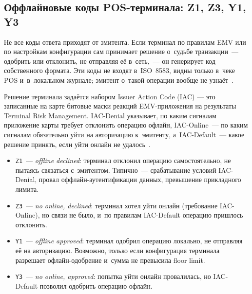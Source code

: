 \subsection*{Оффлайновые коды POS-терминала: Z1, Z3, Y1, Y3}\label{sec:decline-offline-rc}

Не все коды ответа приходят от эмитента. Если терминал по правилам
EMV или по настройкам конфигурации сам принимает решение о~судьбе
транзакции~--- одобрить или отклонить, не отправляя её в~сеть,~---
он генерирует код собственного формата. Эти коды не входят в~ISO~8583,
видны только в~чеке POS и~в~локальном журнале; эмитент о~такой
операции вообще не узнаёт~\cite{emvco-book4}.

Решение терминала задаётся набором Issuer Action Code (IAC) — это записанные на
карте битовые маски реакций EMV-приложения на результаты Terminal Risk
Management. IAC-Denial указывает, по каким сигналам приложение карты
требует отклонить операцию офлайн, IAC-Online~--- по каким сигналам
обязательно уйти на авторизацию к~эмитенту, а~IAC-Default~--- какое
решение принять, если уйти онлайн не удалось~\cite{emvco-book3}.

\begin{itemize}
  \item \texttt{Z1}~--- \textit{offline declined}: терминал отклонил операцию
    самостоятельно, не пытаясь связаться с~эмитентом. Типично~---
    срабатывание условий IAC-Denial, провал оффлайн-аутентификации
    данных, превышение прикладного лимита.
  \item \texttt{Z3}~--- \textit{no online, declined}: терминал хотел уйти
    онлайн (требование IAC-Online), но связи не было, и~по правилам
    IAC-Default операцию пришлось отклонить.
  \item \texttt{Y1}~--- \textit{offline approved}: терминал одобрил операцию
    локально, не отправляя её на авторизацию. Возможно, только
    если конфигурация терминала разрешает офлайн-одобрение
    и~сумма не превысила floor limit.
  \item \texttt{Y3}~--- \textit{no online, approved}: попытка уйти онлайн
    провалилась, но IAC-Default позволил одобрить операцию офлайн.
\end{itemize}

